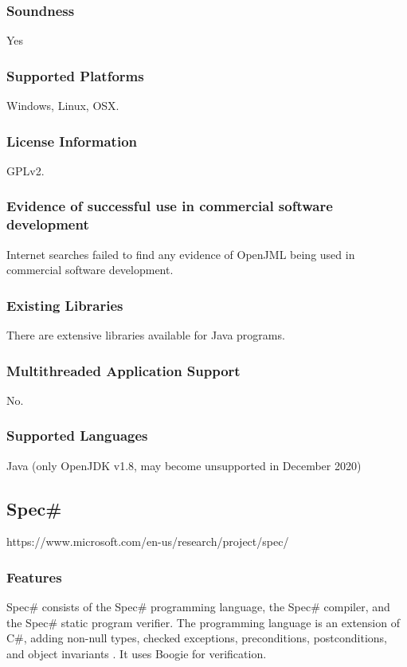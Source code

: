 \documentclass[11pt]{article}
\begin{document}
	\subsubsection{Soundness}
	Yes
	\subsubsection{Supported Platforms}
	Windows, Linux, OSX.
	\subsubsection{License Information}
		GPLv2.
	\subsubsection{Evidence of successful use in commercial software development} 
		Internet searches failed to find any evidence of OpenJML being used in commercial software development. 

	\subsubsection{Existing Libraries} 
		There are extensive libraries available for Java programs.
	\subsubsection{Multithreaded Application Support}
	No.
	\subsubsection{Supported Languages}
	Java (only OpenJDK v1.8, may become unsupported in December 2020)











\subsection{Spec\#}
	https://www.microsoft.com/en-us/research/project/spec/
	\subsubsection{Features}
		Spec\# consists of the Spec\# programming language, the Spec\# compiler, and the Spec\# static program verifier. The programming language is an extension of C\#, adding non-null types, checked exceptions, preconditions, postconditions, and object invariants \cite{spec01}. It uses Boogie for verification.
\end{document}
